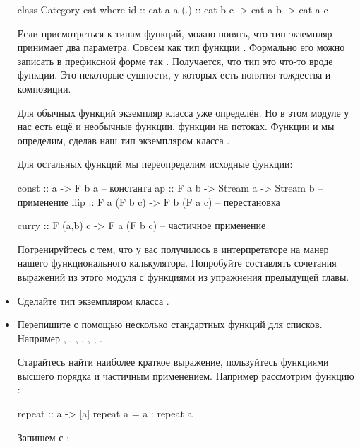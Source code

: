 \begin{itemize}
\begin{code}
class Category cat where
        id  :: cat a a
        (.) :: cat b c -> cat a b -> cat a c
\end{code}

Если присмотреться к типам функций, можно понять,
что тип-экземпляр  принимает два параметра. 
Совсем как тип функции . Формально его можно записать
в префиксной форме так . Получается,
что тип  это что-то вроде функции. Это некоторые
сущности, у которых есть понятия тождества и композиции.

Для обычных функций экземпляр класса 
уже определён. Но в этом модуле у нас есть ещё и 
необычные функции, функции на потоках. Функции 
 и  мы определим, сделав наш тип 
экземпляром класса .

Для остальных функций мы переопределим исходные функции:

\begin{code}
const   :: a -> F b a                       -- константа
ap      :: F a b -> Stream a -> Stream b    -- применение
flip    :: F a (F b c) -> F b (F a c)       -- перестановка

curry   :: F (a,b) c -> F a (F b c)         -- частичное применение
\end{code}

Потренируйтесь с тем, что у вас получилось в интерпретаторе
на манер нашего функционального калькулятора. Попробуйте 
составлять сочетания выражений из этого модуля с функциями из упражнения
предыдущей главы.

\item Сделайте тип  экземпляром класса .

\item Перепишите с помощью  несколько стандартных
        функций для списков. Например , ,
        , , , , .
        
        Старайтесь найти наиболее краткое выражение, пользуйтесь
        функциями высшего порядка и частичным применением. 
        Например рассмотрим функцию :

\begin{code}
repeat :: a -> [a]
repeat a = a : repeat a
\end{code}   

        Запишем с :



\end{itemize}
